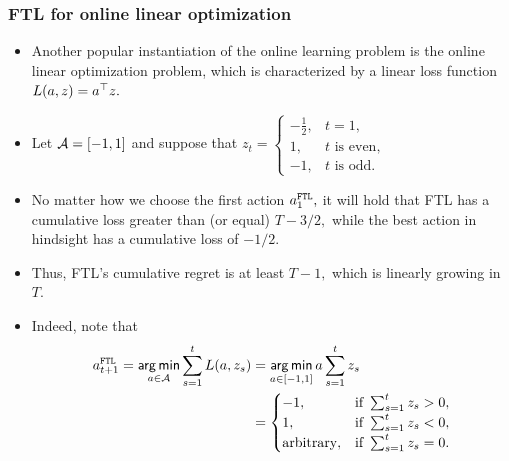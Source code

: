 \begin{vbframe} \frametitle{FTL for online linear optimization}
	\small
	\begin{itemize}
		\item Another popular instantiation of the online learning problem is the online linear optimization problem, which is characterized by a linear loss function $L(a,z)=a^\top z.$ 
		 \item  Let $\mathcal{A}=[-1,1]$ and  suppose that 
		$  z_t = \begin{cases}
			-\frac12, & \mbox{$t=1,$} \\
			1, & \mbox{$t$ is even,}\\
			-1, & \mbox{$t$ is odd.}
		\end{cases} $
		 \item No matter how we choose the first action $a_1^{\texttt{FTL}},$ it will hold that FTL has a cumulative loss greater than (or equal) $T-3/2,$ while the best action in hindsight has a cumulative loss of $-1/2.$ 
%		 
		\item Thus, FTL's cumulative regret is at least $T-1,$ which is linearly growing in $T.$
%		 
		\scriptsize
		\item Indeed, note that 
%		
		\begin{align*}
%			
			a_{t+1}^{\FTL} = \argmin_{a \in \Aspace} \sum_{s=1}^t \l(a,z_s) &= \argmin_{a \in [-1,1]} a \sum_{s=1}^t  z_s \\
			&= \begin{cases}
				-1, & \mbox{if }\sum_{s=1}^t  z_s>0,\\
				1, & \mbox{if }\sum_{s=1}^t  z_s<0,\\
				\mbox{arbitrary}, & \mbox{if }\sum_{s=1}^t  z_s=0.\\
			\end{cases} 
%			
		\end{align*}
		 

\end{itemize}
\end{vbframe}
